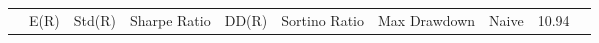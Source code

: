 \begin{tabular}{lrrrrrrrrr}
 & E(R) & Std(R) & Sharpe Ratio & DD(R) & Sortino Ratio & Max Drawdown & %
Naive & 10.94%
\end{tabular}
